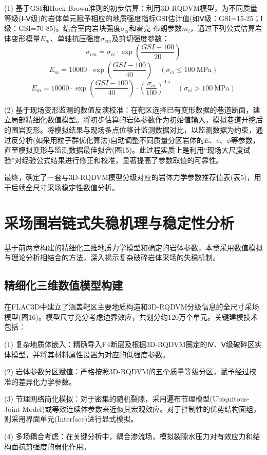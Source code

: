 \documentclass[twocolumn,a4paper,10pt]{article}
\begin{document}
(1) 基于GSI和Hoek-Brown准则的初步估算：利用3D-RQDVM模型，为不同质量等级(Ⅰ-Ⅴ级)的岩体单元赋予相应的地质强度指标GSI估计值(如Ⅴ级：GSI=15-25；Ⅰ级：GSI=70-85)。结合室内岩块强度$\sigma_{ci}$和霍克-布朗参数$m_i$，通过下列公式估算岩体变形模量$E_m$、单轴抗压强度$\sigma_{cm}$及剪切强度参数\cite{15}：
\[
\sigma_{cm} = \sigma_{ci} \cdot \exp\left(\frac{GSI - 100}{20}\right)
\]
\[
E_m = 10000 \cdot \exp\left(\frac{GSI - 100}{40}\right) \quad (\sigma_{ci} \leq 100\ \text{MPa})
\]
\[
E_m = 10000 \cdot \exp\left(\frac{GSI - 100}{40}\right) \cdot \left(\frac{\sigma_{ci}}{100}\right)^{0.5} \quad (\sigma_{ci} > 100\ \text{MPa})
\]

(2) 基于现场变形监测的数值反演校准：在靶区选择已有变形数据的巷道断面，建立局部精细化数值模型。将初步估算的岩体参数作为初始值输入，模拟巷道开挖后的围岩变形。将模拟结果与现场多点位移计监测数据对比，以监测数据为约束，通过反分析(如采用粒子群优化算法)自动调整不同质量分区岩体的$E$、$c$、$\phi$等参数，直至模拟变形与监测数据最佳拟合(图15)。此过程实质上是利用“现场大尺度试验”对经验公式结果进行修正和校准，显著提高了参数取值的可靠性。

最终，确定了一套与3D-RQDVM模型分级对应的岩体力学参数推荐值表(表5)，用于后续全尺寸采场稳定性数值分析。

\section{采场围岩链式失稳机理与稳定性分析}
基于前两章构建的精细化三维地质力学模型和确定的岩体参数，本章采用数值模拟与理论分析相结合的方法，深入揭示复杂破碎岩体采场的失稳机制。

\subsection{精细化三维数值模型构建}
在FLAC3D中建立了涵盖靶区主要地质构造和3D-RQDVM分级信息的全尺寸采场模型(图16)。模型尺寸充分考虑边界效应，共划分约120万个单元。关键建模技术包括：

(1) 复杂地质体嵌入：精确导入F4断层及根据3D-RQDVM圈定的Ⅳ、Ⅴ级破碎区实体模型，并将其材料属性设置为对应的低强度参数。

(2) 岩体参数分区赋值：严格按照3D-RQDVM的五个质量等级分区，赋予经过校准的差异化力学参数。

(3) 节理网络简化模拟：对于密集的随机裂隙，采用遍布节理模型(Ubiquitous-Joint Model)或等效连续体参数来近似其宏观效应。对于控制性的优势结构面组，则采用界面单元(Interface)进行显式模拟。

(4) 多场耦合考虑：在关键分析中，耦合渗流场，模拟裂隙水压力对有效应力和结构面抗剪强度的弱化作用。
\end{document}
